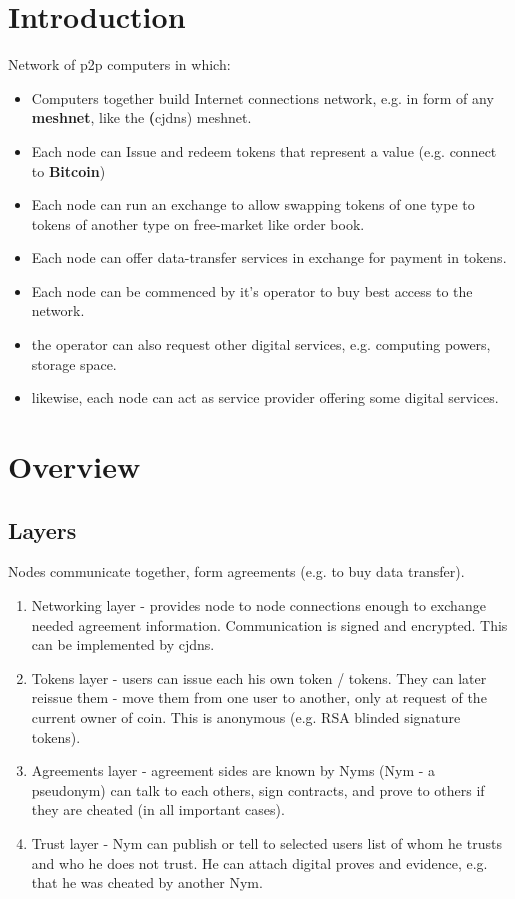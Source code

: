 \documentclass[a4paper,11pt]{article}
\begin{document}
\section{Introduction}
Network of p2p computers in which:
\begin{itemize}
  \item Computers together build Internet connections network, e.g. in form of any \textbf{meshnet}, like the \textbf(cjdns) meshnet.
  \item Each node can Issue and redeem tokens that represent a value (e.g. connect to \textbf{Bitcoin})
  \item Each node can run an exchange to allow swapping tokens of one type to tokens of another type on free-market like order book.
  \item Each node can offer data-transfer services in exchange for payment in tokens.
  \item Each node can be commenced by it's operator to buy best access to the network.
  \item the operator can also request other digital services, e.g. computing powers, storage space.
  \item likewise, each node can act as service provider offering some digital services.
\end{itemize}

\section{Overview}

\subsection{Layers}
Nodes communicate together, form agreements (e.g. to buy data transfer).
\begin{enumerate}
  \item Networking layer - provides node to node connections enough to exchange needed agreement information. Communication is signed and encrypted. This can be implemented by cjdns.
  \item Tokens layer - users can issue each his own token / tokens. They can later reissue them - move them from one user to another, only at request of the current owner of coin. This is anonymous (e.g. RSA blinded signature tokens).
  \item Agreements layer - agreement sides are known by Nyms (Nym - a pseudonym) can talk to each others, sign contracts, and prove to others if they are cheated (in all important cases).
  \item Trust layer - Nym can publish or tell to selected users list of whom he trusts and who he does not trust. He can attach digital proves and evidence, e.g. that he was cheated by another Nym.
\end{enumerate}
\end{document}
